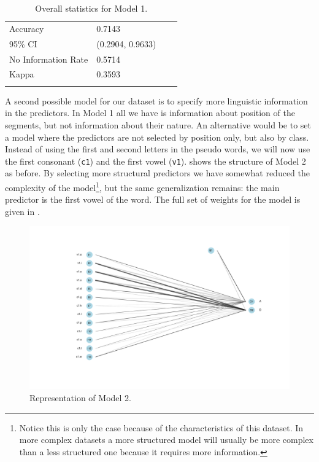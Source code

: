 \begin{table}[!htpb]
  \centering
  \begin{tabular}{llrr}
    \lsptoprule
    \multicolumn{2}{c}{Overall statistics:} \\

    \midrule
    Accuracy            & 0.7143            \\
    95\% CI             & (0.2904, 0.9633)  \\
    No Information Rate & 0.5714            \\
    Kappa               & 0.3593            \\
    \lspbottomrule
  \end{tabular}
  \caption{Overall statistics for Model 1.}\label{tab:stats-model1}
\end{table}

A second possible model for our dataset is to specify more linguistic information in the predictors. In Model 1 all we have is information about position of the segments, but not information about their nature. An alternative would be to set a model where the predictors are not selected by position only, but also by class. Instead of using the first and second letters in the pseudo words, we will now use the first consonant (\texttt{c1}) and the first vowel (\texttt{v1}).  shows the structure of Model 2 as before. By selecting more structural predictors we have somewhat reduced the complexity of the model\footnote{Notice this is only the case because of the characteristics of this dataset. In more complex datasets a more structured model will usually be more complex than a less structured one because it requires more information.}, but the same generalization remains: the main predictor is the first vowel of the word. The full set of weights for the model is given in .

\begin{figure}
  \includegraphics[scale=0.5]{./figures/fake/model2.pdf}
  \caption{Representation of Model 2.}\label{fig:model2}
\end{figure}

